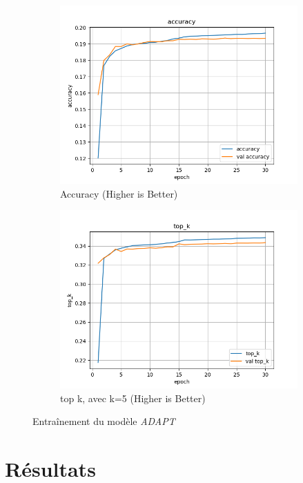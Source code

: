 \documentclass[a4paper]{article}
\begin{document}
\begin{figure}[ht]
  \begin{subfigure}{0.47\textwidth}
    \includegraphics[width=\linewidth]{../logs/learnfromword2vect_0/accuracy.png}
    \caption{Accuracy (Higher is Better)}
  \end{subfigure}
  \hfill
  \begin{subfigure}{0.47\textwidth}
    \includegraphics[width=\linewidth]{../logs/learnfromword2vect_0/top_k.png}
    \caption{top k, avec k=5 (Higher is Better)}
  \end{subfigure}
  \caption{Entraînement du modèle \textit{ADAPT}}
  \label{subfig:result model 3}
\end{figure}

\section{Résultats}
\end{document}
